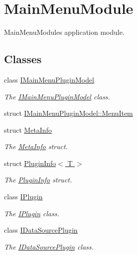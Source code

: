 \hypertarget{group___main_menu_module}{}\section{Main\+Menu\+Module}
\label{group___main_menu_module}


Main\+Menu\+Modules application module.  


\subsection*{Classes}
\begin{DoxyCompactItemize}
\item 
class \hyperlink{class_i_main_menu_plugin_model}{I\+Main\+Menu\+Plugin\+Model}
\begin{DoxyCompactList}\small\item\em The \hyperlink{class_i_main_menu_plugin_model}{I\+Main\+Menu\+Plugin\+Model} class. \end{DoxyCompactList}\item 
struct \hyperlink{struct_i_main_menu_plugin_model_1_1_menu_item}{I\+Main\+Menu\+Plugin\+Model\+::\+Menu\+Item}
\item 
struct \hyperlink{struct_meta_info}{Meta\+Info}
\begin{DoxyCompactList}\small\item\em The \hyperlink{struct_meta_info}{Meta\+Info} struct. \end{DoxyCompactList}\item 
struct \hyperlink{struct_plugin_info}{Plugin\+Info$<$ T $>$}
\begin{DoxyCompactList}\small\item\em The \hyperlink{struct_plugin_info}{Plugin\+Info} struct. \end{DoxyCompactList}\item 
class \hyperlink{class_i_plugin}{I\+Plugin}
\begin{DoxyCompactList}\small\item\em The \hyperlink{class_i_plugin}{I\+Plugin} class. \end{DoxyCompactList}\item 
class \hyperlink{class_i_data_source_plugin}{I\+Data\+Source\+Plugin}
\begin{DoxyCompactList}\small\item\em The \hyperlink{class_i_data_source_plugin}{I\+Data\+Source\+Plugin} class. \end{DoxyCompactList}\item 

\end{DoxyCompactItemize}

